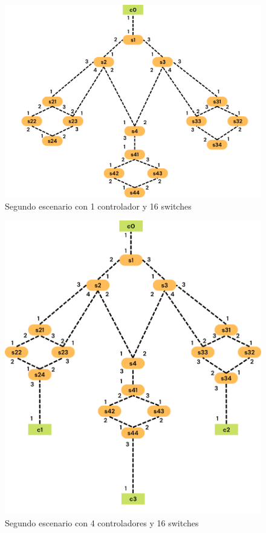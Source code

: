 \documentclass[a4paper, 12pt]{book}
\begin{document}
 	\begin{figure}[H]
 		\centering
 		\includegraphics[width=14cm, keepaspectratio]{img/escenario2-1}
 		\caption{Segundo escenario con 1 controlador y 16 switches}
 		\label{figura:escenario2-1c}
 	\end{figure}
 	
 	\begin{figure}[H]
 		\centering
 		\includegraphics[width=14cm, keepaspectratio]{img/escenario2-2}
 		\caption{Segundo escenario con 4 controladores y 16 switches}
 		\label{figura:escenario2-4c}
 	\end{figure}
 	
\end{document}
